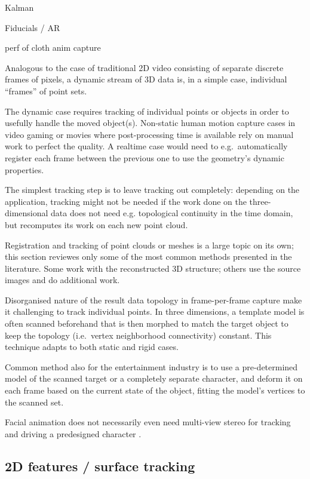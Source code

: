 Kalman

Fiducials / AR

perf of cloth anim capture

Analogous to the case of traditional 2D video consisting of separate discrete frames of pixels, a dynamic stream of 3D data is, in a simple case, individual ``frames'' of point sets.

The dynamic case requires tracking of individual points or objects in order to usefully handle the moved object(s).
Non-static human motion capture cases in video gaming or movies where post-processing time is available rely on manual work to perfect the quality.
A realtime case would need to e.g.~automatically register each frame between the previous one to use the geometry's dynamic properties.

The simplest tracking step is to leave tracking out completely: depending on the application, tracking might not be needed if the work done on the three-dimensional data does not need e.g. topological continuity in the time domain, but recomputes its work on each new point cloud.

Registration and tracking of point clouds or meshes is a large topic on its own; this section reviewes only some of the most common methods presented in the literature. Some work with the reconstructed 3D structure; others use the source images and do additional work.

Disorganised nature of the result data topology in frame-per-frame capture make it challenging to track individual points.
In three dimensions, a template model is often scanned beforehand that is then morphed to match the target object to keep the topology (i.e.~vertex neighborhood connectivity) constant.
This technique adapts to both static and rigid cases.
\cite{bojsen2012tracking,li2009robust}

Common method also for the entertainment industry is to use a pre-determined model of the scanned target or a completely separate character, and deform it on each frame based on the current state of the object, fitting the model's vertices to the scanned set.

Facial animation does not necessarily even need multi-view stereo for tracking and driving a predesigned character \cite{chuang2002performance,deng2007computer}.


\subsection{2D features / surface tracking} %

